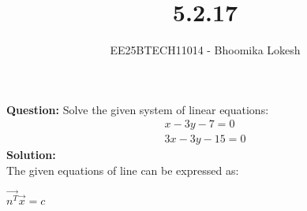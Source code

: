 \documentclass[journal,onecolumn]{IEEEtran}
\begin{document}

\vspace{3cm}

\title{5.2.17}
\author{EE25BTECH11014 - Bhoomika Lokesh}
{\let\newpage\relax\maketitle}

\renewcommand{\thefigure}{\theenumi}
\renewcommand{\thetable}{\theenumi}
\setlength{\intextsep}{10pt} %

\renewcommand{\thetable}{\theenumi}


\textbf{Question:} Solve the given system of linear equations:
\begin{align}
     x-3y-7=0\\  3x-3y-15=0 
\end{align}
\textbf{Solution:}\\
The given equations of line can be expressed as:\\
\begin{center}
   $ \vec{n^T}\vec{x}=c$
\end{center}
\end{document}
